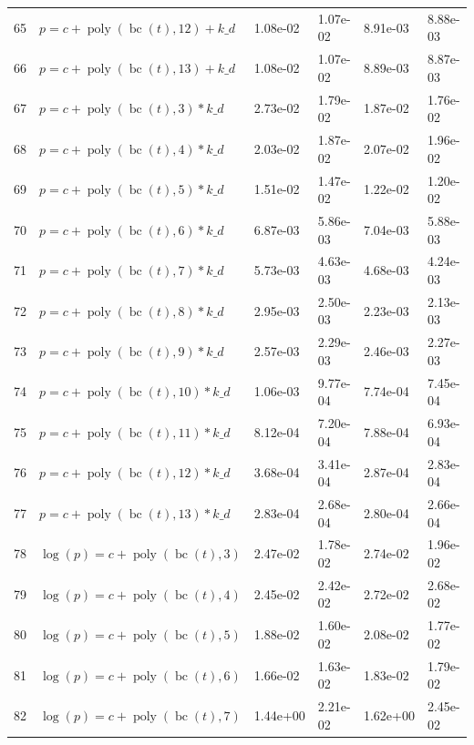 \documentclass[12pt,a4paper]{article}
\DeclareMathOperator{\bc}{bc}
\DeclareMathOperator{\poly}{poly}
\begin{document}
\begin{longtable}[t]{ll>{\raggedleft\arraybackslash}p{2cm}>{\raggedleft\arraybackslash}p{2cm}>{\raggedleft\arraybackslash}p{2cm}>{\raggedleft\arraybackslash}p{2cm}}
\rowcolor{gray!6}  65 & $p = c + \poly\left( \bc(t), 12 \right) + k\_d$ & 1.08e-02 & 1.07e-02 & 8.91e-03 & 8.88e-03\\
66 & $p = c + \poly\left( \bc(t), 13 \right) + k\_d$ & 1.08e-02 & 1.07e-02 & 8.89e-03 & 8.87e-03\\
\rowcolor{gray!6}  67 & $p = c + \poly\left( \bc(t), 3 \right) * k\_d$ & 2.73e-02 & 1.79e-02 & 1.87e-02 & 1.76e-02\\
68 & $p = c + \poly\left( \bc(t), 4 \right) * k\_d$ & 2.03e-02 & 1.87e-02 & 2.07e-02 & 1.96e-02\\
\rowcolor{gray!6}  69 & $p = c + \poly\left( \bc(t), 5 \right) * k\_d$ & 1.51e-02 & 1.47e-02 & 1.22e-02 & 1.20e-02\\
70 & $p = c + \poly\left( \bc(t), 6 \right) * k\_d$ & 6.87e-03 & 5.86e-03 & 7.04e-03 & 5.88e-03\\
\rowcolor{gray!6}  71 & $p = c + \poly\left( \bc(t), 7 \right) * k\_d$ & 5.73e-03 & 4.63e-03 & 4.68e-03 & 4.24e-03\\
72 & $p = c + \poly\left( \bc(t), 8 \right) * k\_d$ & 2.95e-03 & 2.50e-03 & 2.23e-03 & 2.13e-03\\
\rowcolor{gray!6}  73 & $p = c + \poly\left( \bc(t), 9 \right) * k\_d$ & 2.57e-03 & 2.29e-03 & 2.46e-03 & 2.27e-03\\
74 & $p = c + \poly\left( \bc(t), 10 \right) * k\_d$ & 1.06e-03 & 9.77e-04 & 7.74e-04 & 7.45e-04\\
\rowcolor{gray!6}  75 & $p = c + \poly\left( \bc(t), 11 \right) * k\_d$ & 8.12e-04 & 7.20e-04 & 7.88e-04 & 6.93e-04\\
76 & $p = c + \poly\left( \bc(t), 12 \right) * k\_d$ & 3.68e-04 & 3.41e-04 & 2.87e-04 & 2.83e-04\\
\rowcolor{gray!6}  77 & $p = c + \poly\left( \bc(t), 13 \right) * k\_d$ & 2.83e-04 & 2.68e-04 & 2.80e-04 & 2.66e-04\\
78 & $\log(p) = c + \poly\left( \bc(t), 3 \right)$ & 2.47e-02 & 1.78e-02 & 2.74e-02 & 1.96e-02\\
\rowcolor{gray!6}  79 & $\log(p) = c + \poly\left( \bc(t), 4 \right)$ & 2.45e-02 & 2.42e-02 & 2.72e-02 & 2.68e-02\\
80 & $\log(p) = c + \poly\left( \bc(t), 5 \right)$ & 1.88e-02 & 1.60e-02 & 2.08e-02 & 1.77e-02\\
\rowcolor{gray!6}  81 & $\log(p) = c + \poly\left( \bc(t), 6 \right)$ & 1.66e-02 & 1.63e-02 & 1.83e-02 & 1.79e-02\\
82 & $\log(p) = c + \poly\left( \bc(t), 7 \right)$ & 1.44e+00 & 2.21e-02 & 1.62e+00 & 2.45e-02\\

\end{longtable}
\end{document}
